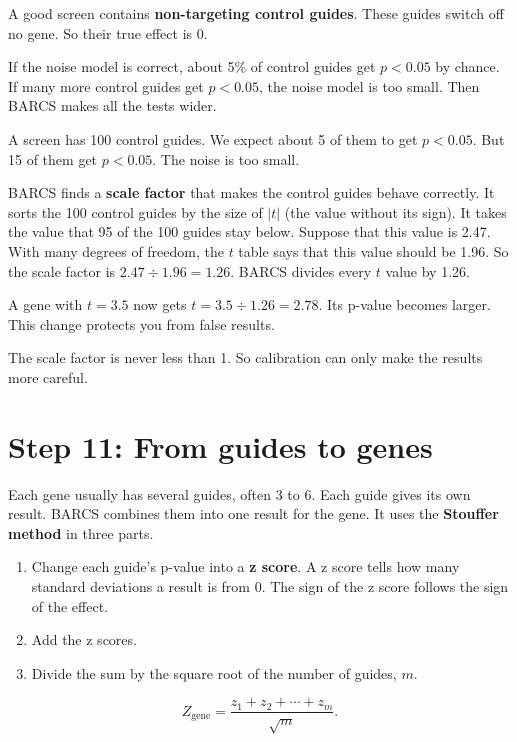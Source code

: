 A good screen contains \textbf{non-targeting control guides}. These guides
switch off no gene. So their true effect is 0.

If the noise model is correct, about 5\% of control guides get
$p < 0.05$ by chance. If many more control guides get $p < 0.05$, the noise
model is too small. Then BARCS makes all the tests wider.

\begin{worked}
A screen has 100 control guides. We expect about 5 of them to get
$p < 0.05$. But 15 of them get $p < 0.05$. The noise is too small.

BARCS finds a \textbf{scale factor} that makes the control guides behave
correctly. It sorts the 100 control guides by the size of $|t|$ (the value
without its sign). It takes the value that 95 of the 100 guides stay below.
Suppose that this value is 2.47. With many degrees of freedom, the $t$ table
says that this value should be 1.96. So the scale factor is
$2.47 \div 1.96 = 1.26$. BARCS divides every $t$ value by 1.26.

A gene with $t = 3.5$ now gets $t = 3.5 \div 1.26 = 2.78$. Its p-value
becomes larger. This change protects you from false results.
\end{worked}

The scale factor is never less than 1. So calibration can only make the
results more careful.

\section{Step 11: From guides to genes}

Each gene usually has several guides, often 3 to 6. Each guide gives its
own result. BARCS combines them into one result for the gene. It uses the
\textbf{Stouffer method} in three parts.

\begin{enumerate}
\item Change each guide's p-value into a \textbf{z score}. A z score tells
  how many standard deviations a result is from 0. The sign of the z score
  follows the sign of the effect.
\item Add the z scores.
\item Divide the sum by the square root of the number of guides, $m$.
\end{enumerate}
\[
Z_{\text{gene}} = \frac{z_1 + z_2 + \cdots + z_m}{\sqrt{m}}.
\]
